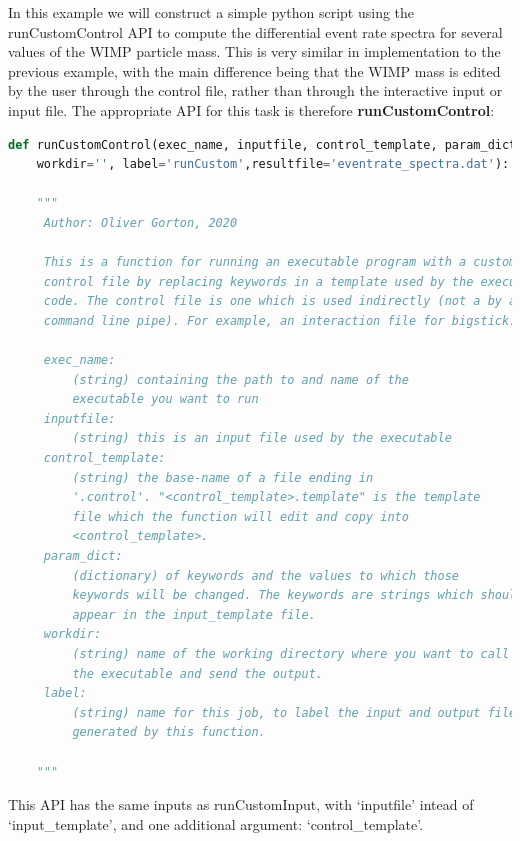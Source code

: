 \documentclass[11pt]{article}
\begin{document}
In this example we will construct a simple python script using the 
runCustomControl API to compute the differential event rate spectra for several
values of the WIMP particle mass. This is very similar in implementation to the
previous example, with the main difference being that the WIMP mass is edited by
the user through the control file, rather than through the interactive input or
input file. The appropriate API for this task is therefore \textbf{
runCustomControl}:
\begin{lstlisting}[language=python]
def runCustomControl(exec_name, inputfile, control_template, param_dict,
    workdir='', label='runCustom',resultfile='eventrate_spectra.dat'):

    """
     Author: Oliver Gorton, 2020

     This is a function for running an executable program with a custom
     control file by replacing keywords in a template used by the executed
     code. The control file is one which is used indirectly (not a by a 
     command line pipe). For example, an interaction file for bigstick.

     exec_name: 
         (string) containing the path to and name of the
         executable you want to run
     inputfile: 
         (string) this is an input file used by the executable
     control_template: 
         (string) the base-name of a file ending in 
         '.control'. "<control_template>.template" is the template 
         file which the function will edit and copy into 
         <control_template>.
     param_dict: 
         (dictionary) of keywords and the values to which those 
         keywords will be changed. The keywords are strings which should 
         appear in the input_template file. 
     workdir: 
         (string) name of the working directory where you want to call
         the executable and send the output.
     label: 
         (string) name for this job, to label the input and output files 
         generated by this function.

    """
\end{lstlisting}
This API has the same inputs as runCustomInput, with `inputfile' intead of
`input\_template', and one additional argument: `control\_template'.
\end{document}
